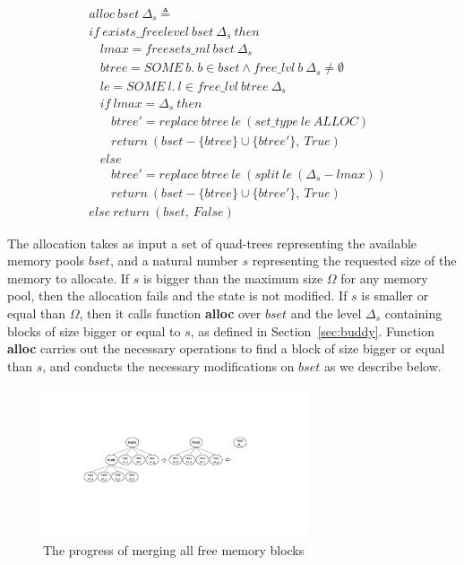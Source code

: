 \begin{definition} 
\begin{align*}
&alloc\ bset\ \Delta_s \triangleq \\
&if\ exists\_freelevel\ bset\ \Delta_s\ then \\
&\ \ \ \ lmax = freesets\_ml\ bset\ \Delta_s \\
&\ \ \ \ btree = SOME\ b.\ b \in bset \wedge free\_lvl\ b\ \Delta_s \ne \emptyset \\
&\ \ \ \ le = SOME\ l.\ l \in free\_lvl\ btree\ \Delta_s \\
&\ \ \ \ if\ lmax = \Delta_s\ then \\
&\ \ \ \ \ \ \ \ btree' = replace\ btree\ le\ (set\_type\ le\ ALLOC) \\
&\ \ \ \ \ \ \ \ return\ (bset - \lbrace btree \rbrace \cup \lbrace btree' \rbrace,\ True) \\
&\ \ \ \ else \\
&\ \ \ \ \ \ \ \ btree' = replace\ btree\ le\ (split\ le\ (\Delta_s - lmax)) \\
&\ \ \ \ \ \ \ \ return\ (bset - \lbrace btree \rbrace \cup \lbrace btree' \rbrace,\ True) \\
&else\ return\ (bset,\ False)
\end{align*}
\end{definition}

The allocation takes as input a set of quad-trees representing the available memory pools $bset$, and a natural number $s$ representing the requested size of the memory to allocate. If $s$ is bigger than the maximum size $\Omega$ for any memory pool, then the allocation fails and the state is not modified. If $s$ is smaller or equal than $\Omega$, then it calls function \textbf{alloc} over $bset$ and the level $\Delta_s$ containing blocks of size bigger or equal to $s$, as defined in Section~\ref{sec:buddy}. Function \textbf{alloc} carries out the necessary operations to find a block of size bigger or equal than $s$, and conducts the necessary modifications on $bset$ as we describe below.

\begin{figure}[htbp]
\centering
\includegraphics[width=0.7\textwidth]{fig2.pdf}
\caption{The progress of merging all free memory blocks}
\label{fig:merginfreeblocks}
\end{figure}

